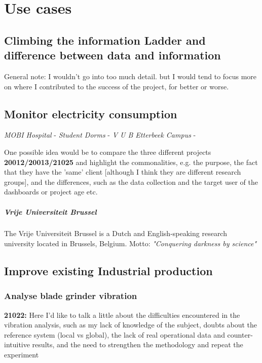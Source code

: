 \chapter{Use cases}\label{chapter:use_cases}

\section{Climbing the information Ladder and difference between data and information}
General note: I wouldn't go into too much detail. but I would tend to focus more on where I contributed to the success of the project, for better or worse.
\section{Monitor electricity consumption}
\textit{MOBI Hospital} -
\textit{Student Dorms} -
\textit{V U B Etterbeek Campus} -

One possible idea would be to compare the three different projects \textbf{20012/20013/21025} and highlight the commonalities, e.g. the purpose, the fact that they have the 'same' client [although I think they are different research groups], and the differences, such as the data collection and the target user of the dashboards or project age etc.

\paragraph{Vrije Universiteit Brussel}
The Vrije Universiteit Brussel is a Dutch and English-speaking research university located in Brussels, Belgium. Motto: \textit{"Conquering darkness by science"}

\section{Improve existing Industrial production}
\subsection{Analyse blade grinder vibration}
\textbf{21022:} Here I'd like to talk a little about the difficulties encountered in the vibration analysis, such as my lack of knowledge of the subject, doubts about the reference system (local vs global), the lack of real operational data and counter-intuitive results, and the need to strengthen the methodology and repeat the experiment \cite{Misc:stumabo_en_website}

% 
